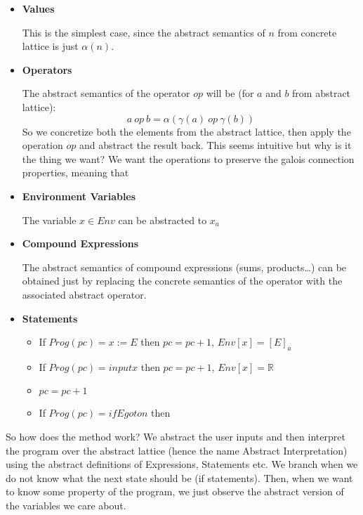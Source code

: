 \begin{itemize}
    \item \textbf{Values}

    This is the simplest case, since the abstract semantics of $n$ from concrete lattice is just $\alpha(n)$.

    \item \textbf{Operators}

    The abstract semantics of the operator $op$ will be (for $a$ and $b$ from abstract lattice):
    \[a \: op \: b = \alpha(\gamma(a) \: op \: \gamma(b))\]
    So we concretize both the elements from the abstract lattice, then apply the operation $op$ and abstract the result
    back.
    This seems intuitive but why is it the thing we want?
    We want the operations to preserve the galois connection properties, meaning that 


    \item \textbf{Environment Variables}

    The variable $x \in Env$ can be abstracted to $x_a$
    \item \textbf{Compound Expressions}

    The abstract semantics of compound expressions (sums, products\ldots) can be obtained just by replacing the
    concrete semantics of the operator with the associated abstract operator.

    \item \textbf{Statements}

    \begin{itemize}
        \item
        If $Prog(pc) = x := E$ then
        $pc = pc + 1$, $Env[x] = [E]_a$

        \item
        If $Prog(pc) = input x$ then
        $pc = pc + 1$, $Env[x] = \mathbb{R}$ %

        \item
        $pc = pc + 1$

        \item
        If $Prog(pc) = if E goto n$ then
    \end{itemize}
\end{itemize}

So how does the method work?
We abstract the user inputs and then interpret the program over the abstract lattice (hence the name Abstract
Interpretation) using the abstract definitions of Expressions, Statements etc.
We branch when we do not know what the next state should be (if statements).
Then, when we want to know some property of the program, we just observe the abstract version of the variables we care
about.

